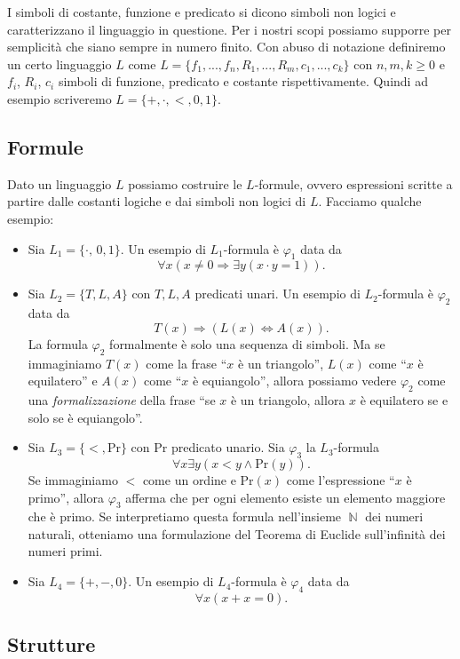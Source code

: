 \documentclass[12pt,a4paper]{report}
\theoremstyle{definition}
\theoremstyle{num.custom-title}
\DeclareMathOperator{\N}{\mathbb{N}}
\DeclareMathOperator{\imp}{\Rightarrow}
\renewcommand{\phi}{\varphi}
\begin{document}
I simboli di costante, funzione e predicato si dicono simboli non logici e caratterizzano il linguaggio in questione. Per i nostri scopi possiamo supporre per semplicità che siano sempre in numero finito. Con abuso di notazione definiremo un certo linguaggio $L$ come $L=\{f_1,...,f_n,R_1,...,R_m, c_1,...,c_k\}$ con $n,m,k \geq 0$ e $f_i$, $R_i$, $c_i$ simboli di funzione, predicato e costante rispettivamente. Quindi ad esempio scriveremo $L=\{+,\cdot,<,0,1\}$.

\subsection{Formule}

Dato un linguaggio $L$ possiamo costruire le $L$-formule, ovvero espressioni scritte a partire dalle costanti logiche e dai simboli non logici di $L$. Facciamo qualche esempio:
\begin{itemize}
\item Sia $L_1=\{\cdot,\,0,1\}$. Un esempio di $L_1$-formula è $\phi_1$ data da
\[
\forall x (x \neq 0 \imp \exists y (x \cdot y = 1)).
\]
\item Sia $L_2=\{T,L,A\}$ con $T,L,A$ predicati unari. Un esempio di $L_2$-formula è $\phi_2$ data da 
\[
T(x) \imp (L(x) \Leftrightarrow A(x)).
\]
La formula $\phi_2$ formalmente è solo una sequenza di simboli. Ma se immaginiamo $T(x)$ come la frase ``$x$ è un triangolo'', $L(x)$ come ``$x$ è equilatero'' e $A(x)$ come ``$x$ è equiangolo'', allora possiamo vedere $\phi_2$ come una \emph{formalizzazione} della frase ``se $x$ è un triangolo, allora $x$ è equilatero se e solo se è equiangolo''.
\item Sia $L_3=\{<,\text{Pr}\}$ con Pr predicato unario. Sia $\phi_3$ la $L_3$-formula
\[
\forall x \exists y (x<y \wedge \text{Pr}(y)).
\]
Se immaginiamo $<$ come un ordine e Pr$(x)$ come l'espressione ``$x$ è primo'', allora $\phi_3$ afferma che per ogni elemento esiste un elemento maggiore che è primo. Se interpretiamo questa formula nell'insieme $\N$ dei numeri naturali, otteniamo una formulazione del Teorema di Euclide sull'infinità dei numeri primi.
\item Sia $L_4=\{+,-,0\}$. Un esempio di $L_4$-formula è $\phi_4$ data da
\[
\forall x (x+x=0).
\]
\end{itemize}

\subsection{Strutture}
\end{document}
